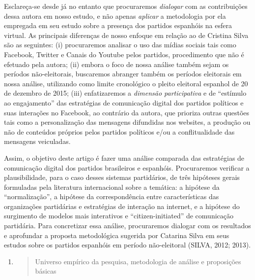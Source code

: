 Esclareça-se desde já no entanto que procuraremos \emph{dialogar} com as
contribuições dessa autora em nosso estudo, e não apenas \emph{aplicar}
a metodologia por ela empregada em seu estudo sobre a presença dos
partidos espanhóis na esfera virtual. As principais diferenças de nosso
enfoque em relação ao de Cristina Silva são as seguintes: (i)
procuraremos analisar o uso das mídias sociais tais como Facebook,
Twitter e Canais do Youtube pelos partidos, procedimento que não é
efetuado pela autora; (ii) embora o foco de nossa análise também sejam
os períodos não-eleitorais, buscaremos abranger também os períodos
eleitorais em nossa análise, utilizando como limite cronológico o pleito
eleitoral espanhol de 20 de dezembro de 2015; (iii) enfatizaremos a
\emph{dimensão participativa} e de ``estímulo ao engajamento'' das
estratégias de comunicação digital dos partidos políticos e suas
interações no Facebook, ao contrário da autora, que prioriza outras
questões tais como a personalização das mensagens difundidas nos
websites, a produção ou não de conteúdos próprios pelos partidos
políticos e/ou a conflitualidade das mensagens veiculadas.

Assim, o objetivo deste artigo é fazer uma análise comparada das
estratégias de comunicação digital dos partidos brasileiros e espanhóis.
Procuraremos verificar a plausibilidade, para o caso desses sistemas
partidários, de três hipóteses gerais formuladas pela literatura
internacional sobre a temática: a hipótese da ``normalização'', a
hipótese da correspondência entre características das organizações
partidárias e estratégias de interação na internet, e a hipótese do
surgimento de modelos mais interativos e ``citizen-initiated'' de
comunicação partidária. Para concretizar essa análise, procuraremos
dialogar com os resultados e aprofundar a proposta metodológica sugerida
por Catarina Silva em seus estudos sobre os partidos espanhóis em
período não-eleitoral (SILVA, 2012; 2013).

\begin{enumerate}
\def\labelenumi{\arabic{enumi})}
\item
  \begin{quote}
  Universo empírico da pesquisa, metodologia de análise e proposições
  básicas
  \end{quote}
\end{enumerate}

